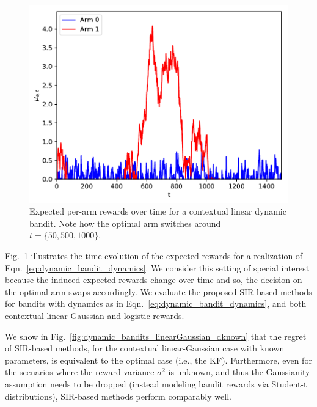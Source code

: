 \documentclass{article}
\newcommand{\ie}{i.e., }
\begin{document}
\begin{figure}[!h]
	\begin{center}
		\centerline{\includegraphics[width=0.6\columnwidth]{./figs/dynamic/dynamics}}
		\caption{Expected per-arm rewards over time for a contextual linear dynamic bandit. Note how the optimal arm switches around $t=\{50, 500, 1000\}$.}
		\label{fig:dynamic_bandits_dynamics}
	\end{center}
\vspace*{-0.5cm}
\end{figure}

Fig.~\ref{fig:dynamic_bandits_dynamics} illustrates the time-evolution of the expected rewards for a realization of Eqn.~\eqref{eq:dynamic_bandit_dynamics}. We consider this setting of special interest because the induced expected rewards change over time and so, the decision on the optimal arm swaps accordingly. We evaluate the proposed SIR-based methods for bandits with dynamics as in Eqn.~\eqref{eq:dynamic_bandit_dynamics}, and both contextual linear-Gaussian and logistic rewards. 

We show in Fig.~\ref{fig:dynamic_bandits_linearGaussian_dknown} that the regret of SIR-based methods, for the contextual linear-Gaussian case with known parameters, is equivalent to the optimal case (\ie the KF). Furthermore, even for the scenarios where the reward variance $\sigma^2$ is unknown, and thus the Gaussianity assumption needs to be dropped (instead modeling bandit rewards via Student-t distributions), SIR-based methods perform comparably well.
\end{document}

